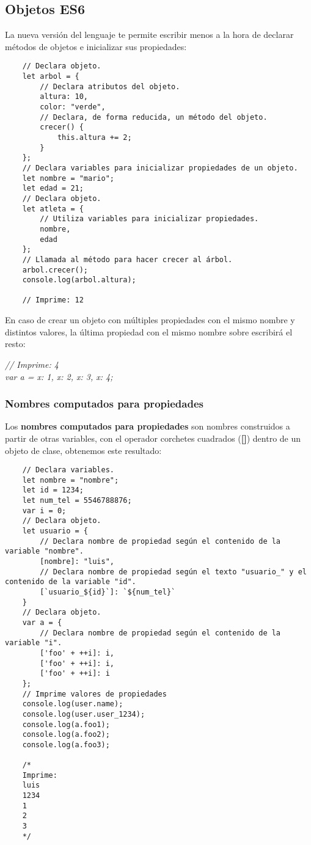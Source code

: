 \subsection{Objetos ES6}
\hspace{0.55cm}La nueva versión del lenguaje te permite escribir menos a la hora de declarar métodos de objetos e inicializar sus propiedades:
\begin{lstlisting}
    // Declara objeto.
    let arbol = {
        // Declara atributos del objeto.
        altura: 10,
        color: "verde",
        // Declara, de forma reducida, un método del objeto.
        crecer() {
            this.altura += 2;
        }
    };
    // Declara variables para inicializar propiedades de un objeto.
    let nombre = "mario";
    let edad = 21;
    // Declara objeto.
    let atleta = {
        // Utiliza variables para inicializar propiedades.
        nombre,
        edad
    };
    // Llamada al método para hacer crecer al árbol.
    arbol.crecer();
    console.log(arbol.altura);

    // Imprime: 12
\end{lstlisting}

En caso de crear un objeto con múltiples propiedades con el mismo nombre y distintos valores, la última propiedad con el mismo nombre sobre escribirá el resto:
\begin{center}
    \textit{
            // Imprime: 4 \\
            var a = {x: 1, x: 2, x: 3, x: 4};
            }
\end{center} 


\subsubsection{Nombres computados para propiedades}
\hspace{0.55cm}Los \textbf{nombres computados para propiedades} son nombres construidos a partir de otras variables, con el operador corchetes cuadrados (\textbf{[]}) dentro de un objeto de clase, obtenemos este resultado:
\begin{lstlisting}
    // Declara variables.
    let nombre = "nombre";
    let id = 1234;
    let num_tel = 5546788876;
    var i = 0;
    // Declara objeto.
    let usuario = {
        // Declara nombre de propiedad según el contenido de la variable "nombre".
        [nombre]: "luis",
        // Declara nombre de propiedad según el texto "usuario_" y el contenido de la variable "id".
        [`usuario_${id}`]: `${num_tel}`
    }
    // Declara objeto.
    var a = {
        // Declara nombre de propiedad según el contenido de la variable "i".
        ['foo' + ++i]: i,
        ['foo' + ++i]: i,
        ['foo' + ++i]: i
    };
    // Imprime valores de propiedades
    console.log(user.name);
    console.log(user.user_1234);
    console.log(a.foo1);
    console.log(a.foo2);
    console.log(a.foo3);

    /*
    Imprime:
    luis
    1234
    1
    2
    3
    */
\end{lstlisting}


